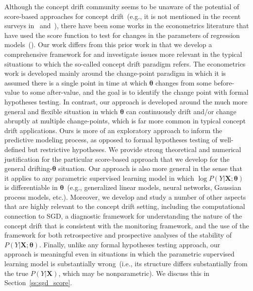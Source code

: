 \documentclass[twoside,11pt]{article}
\begin{document}
Although the concept drift community seems to be unaware of the potential of score-based approaches for concept drift~(e.g., it is not mentioned in the recent surveys in~\cite{barros2018large} and~\cite{lu2018learning}), there have been some works in the econometrics literature that have used the score function to test for changes in the parameters of regression models~(\cite{kuan1995generalized,zeileis2005unified,zeileis2007generalized,xia2009monitoring}). Our work differs from this prior work in that we develop a comprehensive framework for and investigate issues more relevant in the typical situations to which the so-called concept drift paradigm refers. The econometrics work is developed mainly around the change-point paradigm in which it is assumed there is a single point in time at which $\bm{\theta}$ changes from some before-value to some after-value, and the goal is to identify the change point with formal hypotheses testing. In contrast, our approach is developed around the much more general and flexible situation in which $\bm{\theta}$ can continuously drift and/or change abruptly at multiple change-points, which is far more common in typical concept drift applications. Ours is more of an exploratory approach to inform the predictive modeling process, as opposed to formal hypotheses testing of well-defined but restrictive hypotheses. We provide strong theoretical and numerical justification for the particular score-based approach that we develop for the general drifting-$\bm{\theta}$ situation. Our approach is also more general in the sense that it applies to any parametric supervised learning model in which $\log{P(Y|\bm{X};\bm{\theta})}$ is differentiable in $\bm{\theta}$~(e.g., generalized linear models, neural networks, Gaussian process models, etc.). Moreover, we develop and study a number of other aspects that are highly relevant to the concept drift setting, including the computational connection to SGD, a diagnostic framework for understanding the nature of the concept drift that is consistent with the monitoring framework, and the use of the framework for both retrospective and prospective analyses of the stability of $P(Y|\bm{X};\bm{\theta})$. Finally, unlike any formal hypotheses testing approach, our approach is meaningful even in situations in which the parametric supervised learning model is substantially wrong~(i.e., its structure differs substantially from the true $P(Y|\bm{X})$, which may be nonparametric). We discuss this in Section~\ref{ss:sgd_score}.
\end{document}
